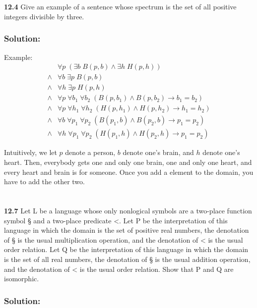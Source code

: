 \documentclass{ctexart}
\begin{document}
\section*{}
\textbf{12.4} Give an example of a sentence whose spectrum is the set of all positive integers
divisible by three.

\subsubsection*{Solution:}
Example:
$$
\begin{array}{rl}
& \forall p\; ( \exists b\; B(p, b) \land \exists h\; H(p, h) ) \\
\land & \forall b\; \exists p\; B(p, b) \\
\land & \forall h\; \exists p\; H(p, h) \\
\land & \forall p\; \forall b_1\; \forall b_2\; ( B(p, b_1) \land B(p, b_2) \to b_1 = b_2 ) \\
\land & \forall p\; \forall h_1\; \forall h_2\; ( H(p, h_1) \land H(p, h_2) \to h_1 = h_2 ) \\
\land & \forall b\; \forall p_1\; \forall p_2\; ( B(p_1, b) \land B(p_2, b) \to p_1 = p_2 ) \\
\land & \forall h\; \forall p_1\; \forall p_2\; ( H(p_1, h) \land H(p_2, h) \to p_1 = p_2 )
\end{array}
$$

Intuitively, we let $p$ denote a person, $b$ denote one's brain, and $h$ denote one's heart. Then,
everybody gets one and only one brain, one and only one heart, and every heart and brain is for someone.
Once you add a element to the domain, you have to add the other two.

\section*{}
\textbf{12.7} Let L be a language whose only nonlogical symbols are a two-place function
symbol § and a two-place predicate <. Let P be the interpretation of this
language in which the domain is the set of positive real numbers, the denotation
of § is the usual multiplication operation, and the denotation of < is the usual
order relation. Let Q be the interpretation of this language in which the domain
is the set of all real numbers, the denotation of § is the usual addition operation,
and the denotation of < is the usual order relation. Show that P and Q are
isomorphic.

\subsubsection*{Solution:}
\end{document}
